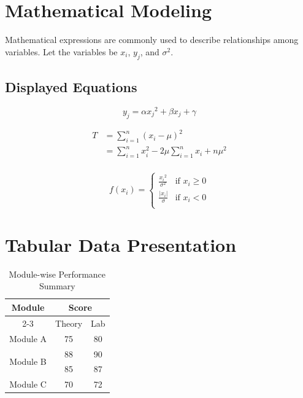 \documentclass{article}
\begin{document}
\section{Mathematical Modeling}
Mathematical expressions are commonly used to describe relationships among
variables. Let the variables be $x_i$, $y_j$, and $\sigma^2$.

\subsection{Displayed Equations}

\begin{equation}
    y_j = \alpha{x_j}^2 + \beta x_j + \gamma
\end{equation}

\begin{align*}
     T &= \sum_{i=1}^{n}(x_i - \mu)^2 \\
     &= \sum_{i=1}^{n}x_i^2 - 2\mu\sum_{i=1}^{n}x_i + n\mu^2 \\ \tag{2}
\end{align*}

\[
f(x_i) = 
\begin{cases}
    \frac{{x_i}^2}{\sigma^2} & \text{if } x_i \geq 0 \\
    \frac{|x_i|}{\sigma}  & \text{if } x_i < 0 \\
    
\end{cases}
\]

\section{Tabular Data Presentation}

\begin{table}[!h]
    \centering
    \begin{tabular}{|c|c|c|}
    \hline
        \multirow{2}{2cm}{\centering \textbf{Module}} & \multicolumn{2}{|c|}{\textbf{Score}} \\ \cline{2-3}
          & Theory & Lab  \\ \hline
          Module A & 75 & 80 \\ \hline
          \multirow{2}{2cm}{\centering Module B} & 88 & 90 \\
          & 85 & 87 \\ \hline
          Module C & 70 & 72 \\ \hline
          
        
    \end{tabular}
    \caption{Module-wise Performance Summary}
    \label{tab:comparison}
\end{table}
\end{document}
